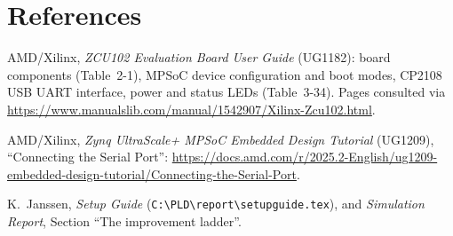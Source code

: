 \documentclass[11pt,a4paper]{article}
\newcommand{\code}[1]{\texttt{#1}}
\newcommand{\bs}{\textbackslash\allowbreak{}}
\renewcommand{\_}{\oldunderscore\allowbreak{}}
\newcommand{\pld}[1]{\code{C:\bs PLD\bs #1}}
\begin{document}
\section*{References}
\begingroup\sloppy
\begin{enumerate}[label={[\arabic*]}, noitemsep]
  \item AMD/Xilinx, \emph{ZCU102 Evaluation Board User Guide} (UG1182): board components (Table~2-1), MPSoC device configuration and boot modes, CP2108 USB UART interface, power and status LEDs (Table~3-34). Pages consulted via \url{https://www.manualslib.com/manual/1542907/Xilinx-Zcu102.html}.
  \item AMD/Xilinx, \emph{Zynq UltraScale+ MPSoC Embedded Design Tutorial} (UG1209), ``Connecting the Serial Port'': \url{https://docs.amd.com/r/2025.2-English/ug1209-embedded-design-tutorial/Connecting-the-Serial-Port}.
  \item K.~Janssen, \emph{Setup Guide} (\pld{report\bs setup\_guide.tex}), and \emph{Simulation Report}, Section ``The improvement ladder''.
\end{enumerate}
\endgroup
\end{document}
